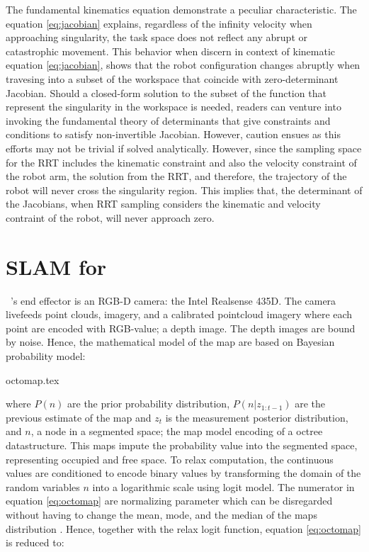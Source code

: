 The fundamental kinematics equation demonstrate a peculiar characteristic.
The equation \ref{eq:jacobian} explains, regardless of the infinity velocity when approaching 
singularity, the task space does not reflect 
any abrupt or catastrophic movement. This behavior when discern in context
of kinematic equation \ref{eq:jacobian}, shows that the robot configuration 
changes abruptly when travesing into a subset of the workspace
that coincide with 
zero-determinant Jacobian.
Should a closed-form solution to the subset of the function that represent the 
singularity in the workspace is needed, readers can venture into
invoking the fundamental theory of determinants that give
constraints and conditions to satisfy non-invertible Jacobian. However, caution ensues as
this efforts may not be trivial if solved analytically. 
However, since the sampling space for the RRT includes the 
kinematic constraint and also the velocity constraint of the
robot arm, the solution from the RRT, and therefore, the trajectory of the
robot will never cross the singularity region. This
implies that, the determinant of the Jacobians, when RRT sampling 
considers the kinematic and velocity contraint of the robot, will
never approach zero. 
\section{SLAM for \rimini}\label{sec:slam_graph}

\rimini~'s end effector is an RGB-D camera: the Intel Realsense
435D. The camera livefeeds point clouds, imagery, and a calibrated
pointcloud imagery where each point are encoded with RGB-value; a depth 
image. The depth images are bound by noise. Hence, the mathematical
model of the map are based on Bayesian probability model:

 {octomap.tex}

where $P(n)$ are the prior probability distribution, 
$P(n|z_{1:t-1})$ are the previous estimate of the map and $z_t$ 
is the measurement posterior distribution, and $n$, a node in
a segmented space; the map model
encoding of a octree datastructure.
This maps impute the probability value into the segmented space, 
representing occupied and free space. To relax computation, the 
continuous values are conditioned to encode binary values by 
transforming the domain of the random variables $n$ into a logarithmic
scale using logit model. 
The numerator in equation \ref{eq:octomap} are normalizing 
parameter which can be disregarded without having to 
change the mean, mode, and the median of the maps distribution
\parencite{Hornung2013}. 
Hence, together with the relax logit function, equation \ref{eq:octomap}
is reduced to:


